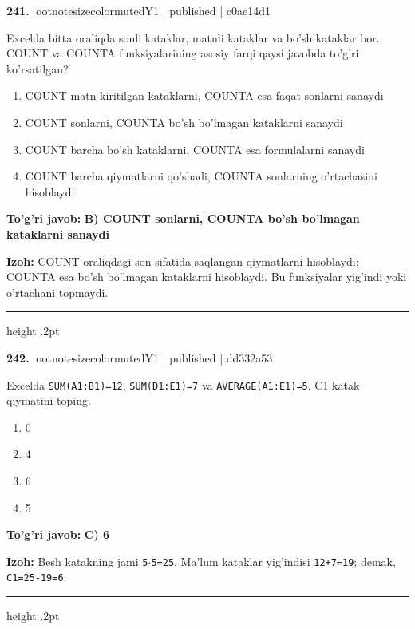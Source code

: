 \documentclass[10pt,a4paper]{article}
\begin{document}
\textbf{\color{ink}241.} {ootnotesizecolor{muted}Y1 | published | c0ae14d1}
\par
Excelda bitta oraliqda sonli kataklar, matnli kataklar va bo'sh kataklar bor. COUNT va COUNTA funksiyalarining asosiy farqi qaysi javobda to'g'ri ko'rsatilgan?
\begin{enumerate}[label=\Alph*),leftmargin=9mm]
\item COUNT matn kiritilgan kataklarni, COUNTA esa faqat sonlarni sanaydi
\item COUNT sonlarni, COUNTA bo'sh bo'lmagan kataklarni sanaydi
\item COUNT barcha bo'sh kataklarni, COUNTA esa formulalarni sanaydi
\item COUNT barcha qiymatlarni qo'shadi, COUNTA sonlarning o'rtachasini hisoblaydi
\end{enumerate}
\begin{tcolorbox}[enhanced,breakable,colback=teal!4,colframe=teal!55!black,boxrule=0.45pt,arc=1.2mm,left=2.8mm,right=2.8mm,top=2mm,bottom=2mm]
\textbf{\color{teal}To'g'ri javob:} \textbf{B) COUNT sonlarni, COUNTA bo'sh bo'lmagan kataklarni sanaydi}
\par\smallskip
\textbf{Izoh:} COUNT oraliqdagi son sifatida saqlangan qiymatlarni hisoblaydi; COUNTA esa bo'sh bo'lmagan kataklarni hisoblaydi. Bu funksiyalar yig'indi yoki o'rtachani topmaydi.
\end{tcolorbox}
\vspace{2mm}\hrule height .2pt\vspace{2mm}

\textbf{\color{ink}242.} {ootnotesizecolor{muted}Y1 | published | dd332a53}
\par
Excelda \texttt{SUM(A1:B1)=12}, \texttt{SUM(D1:E1)=7} va \texttt{AVERAGE(A1:E1)=5}. C1 katak qiymatini toping.
\begin{enumerate}[label=\Alph*),leftmargin=9mm]
\item 0
\item 4
\item 6
\item 5
\end{enumerate}
\begin{tcolorbox}[enhanced,breakable,colback=teal!4,colframe=teal!55!black,boxrule=0.45pt,arc=1.2mm,left=2.8mm,right=2.8mm,top=2mm,bottom=2mm]
\textbf{\color{teal}To'g'ri javob:} \textbf{C) 6}
\par\smallskip
\textbf{Izoh:} Besh katakning jami \texttt{5\ensuremath{\cdot}5=25}. Ma'lum kataklar yig'indisi \texttt{12+7=19}; demak, \texttt{C1=25-19=6}.
\end{tcolorbox}
\vspace{2mm}\hrule height .2pt\vspace{2mm}
\end{document}

